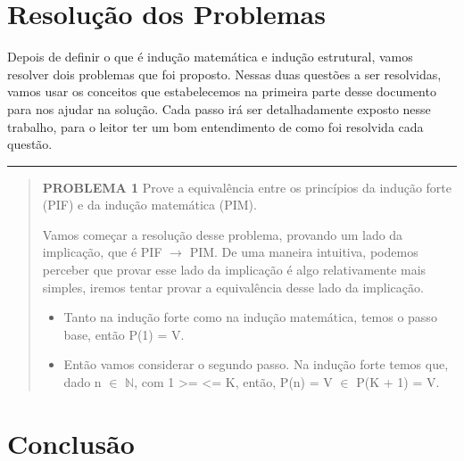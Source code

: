 \documentclass[a4paper, 10pt]{article}
\begin{document}
\section{Resolução dos Problemas}
Depois de definir o que é indução matemática e indução estrutural, vamos resolver dois problemas que foi proposto. Nessas duas questões a ser resolvidas, vamos usar os conceitos que estabelecemos na primeira parte desse documento para nos ajudar na solução. Cada passo irá ser detalhadamente exposto nesse trabalho, para o leitor ter um bom entendimento de como foi resolvida cada questão.
\hrule
\begin{quote}
  \textbf{PROBLEMA 1}
  Prove a equivalência entre os princípios da indução forte (PIF) e da indução matemática (PIM).
        
        Vamos começar a resolução desse problema, provando um lado da implicação, que é PIF $\to$ PIM. De uma maneira intuitiva, podemos perceber que provar esse lado da implicação é algo relativamente mais simples, iremos tentar provar a equivalência desse lado da implicação.
        \begin{itemize}
        \item Tanto na indução forte como na indução matemática, temos o passo base, então P(1) = V.
           \item Então vamos considerar o segundo passo. Na indução forte temos que, dado n $\in$ $\mathbb{N}$, com 1 >= <= K, então, P(n) = V $\in$ P(K + 1) = V.
         
        \end{itemize}
  \end{quote}



\section{Conclusão}
\end{document}
